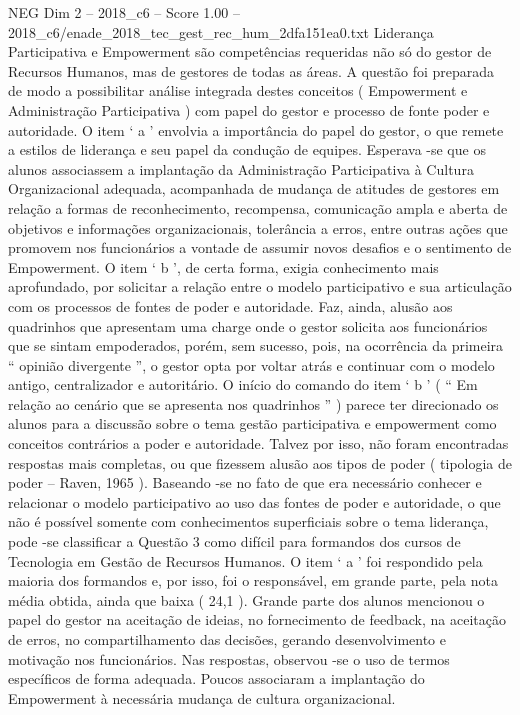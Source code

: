 \begin{textsample}{NEG Dim 2 – 2018\_c6 – Score 1.00 – 2018\_c6/enade\_2018\_tec\_gest\_rec\_hum\_2dfa151ea0.txt}
Liderança Participativa e Empowerment são competências requeridas não só do gestor de Recursos Humanos, mas de gestores de todas as áreas.
A questão foi preparada de modo a possibilitar análise integrada destes conceitos ( Empowerment e Administração Participativa ) com papel do gestor e processo de fonte poder e autoridade.
O item ‘ a ’ envolvia a importância do papel do gestor, o que remete a estilos de liderança e seu papel da condução de equipes.
Esperava -se que os alunos associassem a implantação da Administração Participativa à Cultura Organizacional adequada, acompanhada de mudança de atitudes de gestores em relação a formas de reconhecimento, recompensa, comunicação ampla e aberta de objetivos e informações organizacionais, tolerância a erros, entre outras ações que promovem nos funcionários a vontade de assumir novos desafios e o sentimento de Empowerment.
O item ‘ b ’, de certa forma, exigia conhecimento mais aprofundado, por solicitar a relação entre o modelo participativo e sua articulação com os processos de fontes de poder e autoridade.
Faz, ainda, alusão aos quadrinhos que apresentam uma charge onde o gestor solicita aos funcionários que se sintam empoderados, porém, sem sucesso, pois, na ocorrência da primeira “ opinião divergente ”, o gestor opta por voltar atrás e continuar com o modelo antigo, centralizador e autoritário.
O início do comando do item ‘ b ’ ( “ Em relação ao cenário que se apresenta nos quadrinhos ” ) parece ter direcionado os alunos para a discussão sobre o tema gestão participativa e empowerment como conceitos contrários a poder e autoridade.
Talvez por isso, não foram encontradas respostas mais completas, ou que fizessem alusão aos tipos de poder ( tipologia de poder – Raven, 1965 ).
Baseando -se no fato de que era necessário conhecer e relacionar o modelo participativo ao uso das fontes de poder e autoridade, o que não é possível somente com conhecimentos superficiais sobre o tema liderança, pode -se classificar a Questão 3 como difícil para formandos dos cursos de Tecnologia em Gestão de Recursos Humanos.
O item ‘ a ’ foi respondido pela maioria dos formandos e, por isso, foi o responsável, em grande parte, pela nota média obtida, ainda que baixa ( 24,1 ).
Grande parte dos alunos mencionou o papel do gestor na aceitação de ideias, no fornecimento de feedback, na aceitação de erros, no compartilhamento das decisões, gerando desenvolvimento e motivação nos funcionários.
Nas respostas, observou -se o uso de termos específicos de forma adequada.
Poucos associaram a implantação do Empowerment à necessária mudança de cultura organizacional.

\end{textsample}
